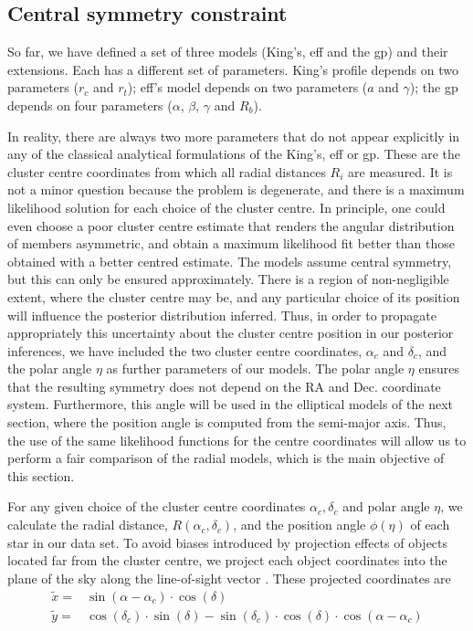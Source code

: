 \subsection{Central symmetry constraint}
\label{sect:CentreModels}

So far, we have defined a set of three models (King's, \gls{eff} and the \gls{gp}) and their extensions. Each has a different set of parameters. King's profile depends on two parameters ($r_c$ and $r_t$); \gls{eff}'s model depends on two parameters ($a$ and $\gamma$); the \gls{gp} depends on four parameters ($\alpha$, $\beta$, $\gamma$ and $R_b$).

In reality, there are always two more parameters that do not appear explicitly in any of the classical analytical formulations of the King's, \gls{eff} or \gls{gp}. These are the cluster centre coordinates from which all radial distances $R_i$ are measured. It is not a minor question because the problem is degenerate, and there is a maximum likelihood solution for each choice of the cluster centre. In principle, one could even choose a poor cluster centre estimate that renders the angular distribution of members asymmetric, and obtain a maximum likelihood fit better than those obtained with a better centred estimate.  The models assume central symmetry, but this can only be ensured approximately. There is a region of non-negligible extent, where the cluster centre may be, and any particular choice of its position will influence the posterior distribution inferred. Thus, in order to propagate appropriately this uncertainty about the cluster centre position in our posterior inferences, we have included the two cluster centre coordinates, $\alpha_c$ and $\delta_c$, and the polar angle $\eta$ as further parameters of our models. The polar angle $\eta$ ensures that the resulting symmetry does not depend on the RA and Dec. coordinate system. Furthermore, this angle will be used in the elliptical models of the next section, where the position angle is computed from the semi-major axis. Thus, the use of the same likelihood functions for the centre coordinates will allow us to perform a fair comparison of the radial models, which is the main objective of this section.

For any given choice of the cluster centre coordinates $\alpha_c,\delta_c$ and polar angle $\eta$, we calculate the radial distance, $R(\alpha_c,\delta_c)$, and the position angle $\phi(\eta)$ of each star in our data set. To avoid biases introduced by projection effects of objects located far from the cluster centre, we project each object coordinates into the plane of the sky along the line-of-sight vector \cite[see for example, Eq. 1 of][]{2006A&A...445..513V}. These projected coordinates are
\begin{align}
\tilde{x} =&\sin(\alpha - \alpha_c ) \cdot \cos(\delta)\nonumber\\
\tilde{y} = &\cos(\delta_c)\cdot \sin(\delta) - \sin(\delta_c)\cdot \cos(\delta)\cdot\cos(\alpha - \alpha_c)
\end{align}

